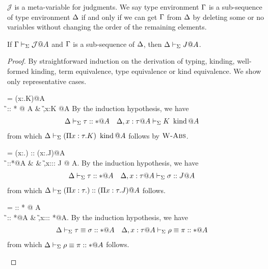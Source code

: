 

$\mathcal{J}$ is a meta-variable for judgments.
We say type environment \(\Gamma\) is a sub-sequence of type environment \(\Delta\)
if and only if we can get \(\Gamma\) from \(\Delta\) by deleting some or no variables without changing the order of the remaining elements.
\begin{lemma}[Weakening]
    If \(\Gamma \vdash_\Sigma \mathcal{J}@A\) and \(\Gamma\) is a sub-sequence of \(\Delta\), then \(\Delta \vdash_\Sigma J@A\).
\end{lemma}

\begin{proof}
    By straightforward induction on the derivation of typing, kinding, well-formed kinding,
    term equivalence, type equivalence or kind equivalence.
    We show only representative cases.

    \begin{rneqncase}{\WAbs{}}{
             = (\Pi x:\tau.K)\iskind @A \\
            \G \V \tau :: * @ A & \G,x:\tau@A \V K \iskind @A
            }
            By the induction hypothesis, we have
            \begin{align*}
                & \D \V \tau::*@A &  & \D, x:\tau@A \V K \iskind @ A
            \end{align*}
            from which $\Delta\vdash_\Sigma (\Pi x:\tau.K) \operatorname{\ kind} @ A$ follows by $\textsc{W-Abs}$.
    \end{rneqncase}

    \begin{rneqncase}{\KAbs{}}{
             = (\Pi x:\tau.) :: (\Pi x:\tau.J)@A \\
            \G \V \tau::*@A &  & \G,x:\tau@A\V \sigma :: J @ A.
            }
            By the induction hypothesis, we have
            \begin{align*}
                & \D \V \tau::*@A &  & \D,x:\tau@A\V \sigma :: J @ A
            \end{align*}
            from which $\Delta \vdash_\Sigma (\Pi x:\tau.) :: (\Pi x:\tau.J)@A$ follows.
    \end{rneqncase}

    \begin{rneqncase}{
            \QTAbs{}}{
             = \rho \E \pi :: * @ A \\
            \G\V \tau \E \sigma :: *@A  & \G,x:\tau@A \V \rho \E \pi :: *@A.
            }
            By the induction hypothesis, we have
            \begin{align*}
                & \D\V \tau \E \sigma :: *@A &  & \D,x:\tau@A \V \rho \E \pi :: *@A
            \end{align*}
            from which \( \Delta\vdash_\Sigma \rho \equiv \pi :: * @ A \) follows.
    \end{rneqncase}
\end{proof}

